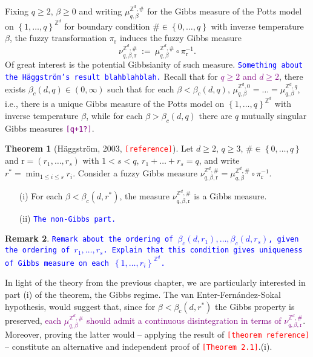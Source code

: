 \documentclass[12pt]{article}
\renewcommand{\r}{\mathrm{r}}
\newcommand{\Z}{\mathbb{Z}}
\newcommand{\set}[1]{\left\{#1\right\}}
\newcommand{\1}{\mathbbm{1}}
\newcommand{\5}{\vspace{0.5cm}}
\theoremstyle{definition}
\newtheorem{thm}{Theorem}[section]
\newtheorem{rem}[thm]{Remark}
\begin{document}
Fixing $q\geq 2$, $\beta\geq 0$ and writing $\mu_{q,\beta}^{\Z^d,\#}$ for the Gibbs measure of the Potts model on $\set{1,\ldots,q}^{\Z^d}$ for boundary condition $\#\in\set{0,\ldots,q}$ with inverse temperature $\beta$, the fuzzy transformation $\pi_\r$ induces the fuzzy Gibbs measure 
$$\nu_{q,\beta,\r}^{\Z^d,\#} ~:=~ \mu_{q,\beta}^{\Z^d,\#}\circ\pi_\r^{-1}.$$
Of great interest is the potential Gibbsianity of such measure. \textcolor{blue}{\texttt{Something about the H\"aggstr\"om's result blahblahblah.}} Recall that for \textcolor{purple}{$q\geq 2$ and $d\geq 2$}, there exists $\beta_c(d,q)\in(0,\infty)$ such that for each $\beta<\beta_c(d,q)$, $\mu_{q,\beta}^{\Z^d,0}=\ldots=\mu_{q,\beta}^{\Z^d,q}$, i.e., there is a unique Gibbs measure of the Potts model on $\set{1,\ldots,q}^{\Z^d}$ with inverse temperature $\beta$, while for each $\beta>\beta_c(d,q)$ there are $q$ mutually singular Gibbs measures \textcolor{purple}{\texttt{[q+1?]}}.

\begin{thm}[H\"aggstr\"om, 2003, \textcolor{red}{\texttt{[reference]}}]
Let $d\geq 2$, $q\geq 3$, $\#\in\set{0,\ldots,q}$ and $\r=(r_1,\ldots,r_s)$ with $1<s<q$, $r_1+\ldots+r_s=q$, and write $r^*=\min_{1\leq i\leq s}r_i$. Consider a fuzzy Gibbs measure $\nu_{q,\beta,\r}^{\Z^d,\#}=\mu_{q,\beta}^{\Z^d,\#}\circ\pi_{\r}^{-1}$.
\begin{itemize}
	\item[(i)] For each $\beta<\beta_c(d,r^*)$, the measure $\nu_{q,\beta,\r}^{\Z^d,\#}$ is a Gibbs measure.
	\item[(ii)] \textcolor{blue}{\texttt{The non-Gibbs part.}}
\end{itemize}
\end{thm}

\begin{rem}
\textcolor{blue}{\texttt{Remark about the ordering of $\beta_c(d,r_1),\ldots,\beta_c(d,r_s)$, given the ordering of $r_1,\ldots,r_s$. Explain that this condition gives uniqueness of Gibbs measure on each $\set{1,\ldots,r_i}^{\Z^d}$.}}
\end{rem}

In light of the theory from the previous chapter, we are particularly interested in part (i) of the theorem, the Gibbs regime. The van Enter-Fern\'andez-Sokal hypothesis, would suggest that, since for $\beta<\beta_c(d,r^*)$ the Gibbs property is preserved, \textcolor{purple}{each $\mu_{q,\beta}^{\Z^d,\#}$ should admit a continuous disintegration in terms of $\nu_{q,\beta,\r}^{\Z^d,\#}$}. Moreover, proving the latter would -- applying the result of \textcolor{red}{\texttt{[theorem reference]}} -- constitute an alternative and independent proof of \textcolor{red}{\texttt{[Theorem 2.1]}}.(i). \\
\end{document}
